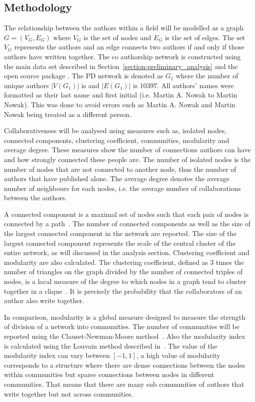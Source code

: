 \documentclass{article}
\theoremstyle{definition}
\newcommand{\authors}{}
\begin{document}
\subsection{Methodology}\label{section:methodology}

The relationship between the authors within a field will be modelled as a graph
\(G = (V_G, E_G)\) where \(V_G\) is the set of nodes and \(E_G\)  is the set of
edges. The set \(V_G\) represents the authors and an edge connects two authors
if and only if those authors have written together. The co authorship network is
constructed using the main data set described in
Section~\ref{section:preliminary_analysis} and the open source package
\cite{networkx}. The PD network is denoted as \(G_1\) where the
number of unique authors \(|V(G_1)|\) is \authors and \(|E(G_1)|\) is 10397.
All authors' names were formatted as their last name and first initial (i.e.
Martin A. Nowak to Martin Nowak). This was done to avoid errors such as Martin
A. Nowak and Martin Nowak being treated as a different person.

Collaborativeness will be analysed using measures such as, isolated nodes,
connected components, clustering coefficient, communities, modularity and average degree.
These measures show the number of connections authors can have
and how strongly connected these people are. The number of isolated nodes is the
number of nodes that are not connected to another node, thus the
number of authors that have published alone. The average degree denotes the average
number of neighbours for each nodes, i.e. the average number of collaborations
between the authors.

A connected component is a maximal set of nodes such that each pair of nodes is
connected by a path~\cite{Easley2010}. The number of connected components as well as the size of the
largest connected component in the network are reported.
The size of the largest connected component represents the scale of the central cluster
of the entire network, as will discussed in the analysis section.
Clustering coefficient and modularity are also calculated. The clustering
coefficient, defined as 3 times the number of triangles on the graph divided
by the number of connected triples of nodes, is a local measure of the degree to
which nodes in a graph tend to cluster together
in a clique~\cite{Easley2010}. It is precisely the probability that the collaborators
of an author also write together.

In comparison, modularity is a global measure designed to measure the strength of
division of a network into communities. The number of communities will be reported
using the Clauset-Newman-Moore method~\cite{clauset2004}. Also the modularity index
is calculated using the Louvain method described in~\cite{Blondel2008}. The value
of the modularity index can vary between \([-1, 1]\), a high value of modularity
corresponds to a structure where there are dense connections between the nodes within
communities but sparse connections between nodes in different communities.
That means that there are many sub communities of authors that write together
but not across communities.
\end{document}
